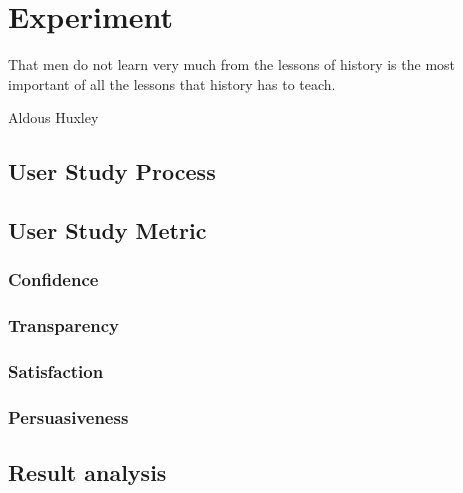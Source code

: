 
\section{Experiment}
\label{ch:experiment}

\epigraph{That men do not learn very much from the lessons of history is the most important of all the lessons that history has to teach.}{Aldous Huxley}

\subsection{User Study Process}

\subsection{User Study Metric}
	\subsubsection{Confidence}
	\subsubsection{Transparency}
	\subsubsection{Satisfaction}
	\subsubsection{Persuasiveness}
	
\subsection{Result analysis}

\cleardoublepage